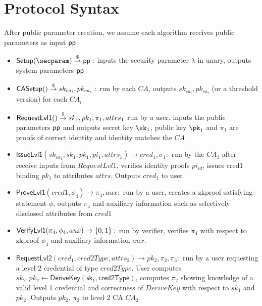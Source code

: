 \section{Protocol Syntax}
After public parameter creation, we assume each algorithm receives public parameters as input $\mathsf{pp}$ 
\begin{itemize}

    \item $\mathsf{Setup}(\secparam) \torand \ppar:$ inputs the security parameter $\lambda$ in unary, outputs system parameters $\mathsf{pp}$

    \item $\mathsf{CASetup}() \stackrel{\$}{\to} sk_{ca_i}, pk_{ca_i}:$ run by each $CA$, outputs $sk_{ca_i}, pk_{ca_i}$ (or a threshold version) for each $CA_i$

    \item $\mathsf{RequestLvl1}() \stackrel{\$}{\to} sk_1, pk_1, \pi_{1}, attrs_1$ run by a user, inputs the public parameters $\mathsf{pp}$ and outputs secret key $\sk_1$, public key $\pk_1$ and  $\pi_{1}$ are proofs of correct identity and identity matches the $CA$
    
    \item $\mathsf{IssueLvl1}(sk_{ca_1}, sk_1, pk_1, pi_{1}, attrs_1) \to cred_1, \sigma_1:$ run by the $CA_1$ after receive inputs from $RequestLvl1$, verifies identity proofs $pi_{id}$, issues cred1 binding $pk_1$ to attributes $attrs$. Outputs $cred_1$ to user

    \item $\mathsf{ProveLvl1}(cred1, \phi_4) \to \pi_4, aux:$ run by a user, creates a zkproof satisfying statement $\phi$, outputs $\pi_4$ and auxiliary information such as selectively disclosed attributes from $cred1$

    \item $\mathsf{VerifyLvl1}(\pi_4, \phi_4, aux) \to \{0,1\}: $ run by verifier, verifies $\pi_4$ with respect to zkproof $\phi_4$ and auxiliary information $aux$.
    
    \item $\mathsf{RequestLvl2}(cred_1, cred2Type, attrs_2) \to pk_2, \pi_{2}, \pi_{3}:$ run by a user requesting a level 2 credential of type $cred2Type$. User computes $sk_2, pk_2 \gets \mathsf{DeriveKey(sk_1, cred2Type)}$, computes $\pi_{2}$ showing knowledge of a valid level 1 credential and correctness of $DeriveKey$ with respect to $sk_1$ and $pk_2$. Outputs $pk_2$, $\pi_{2}$ to level 2 CA $CA_2$


\end{itemize}
